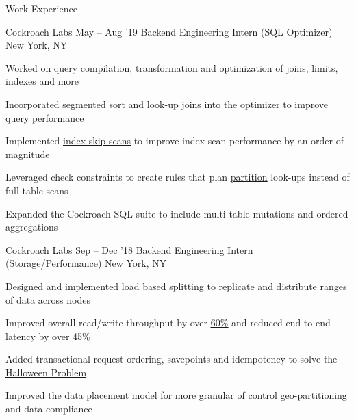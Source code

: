 \documentclass{resume} %
\begin{document}
\begin{rSection}{Work Experience}
  \begin{rSubsection}{Cockroach Labs}
    {May -- Aug '19}
         {Backend Engineering Intern (SQL Optimizer)}
         {New York, NY}
       \item Worked on query compilation, transformation and
         optimization of joins, limits, indexes and more
       \item Incorporated 
         \href{https://github.com/cockroachdb/cockroach/pull/38452}{\underline{segmented
             sort}}
         and 
         \href{https://github.com/cockroachdb/cockroach/pull/38285}{\underline{look-up}}
             joins into the optimizer
         to improve query performance
       \item Implemented
         \href{https://github.com/cockroachdb/cockroach/pull/39668}{\ul{index-skip-scans}}
         to improve index scan performance by an order of magnitude
       \item Leveraged check constraints to create rules that plan
         \href{https://github.com/cockroachdb/cockroach/pull/38963}{\underline{partition}}
         look-ups instead of full table scans
       \item Expanded the Cockroach SQL suite to include multi-table mutations
         and ordered aggregations
  \end{rSubsection}

  \begin{rSubsection}{Cockroach Labs}
    {Sep -- Dec '18}
         {Backend Engineering Intern (Storage/Performance)}
         {New York, NY}
       \item Designed and implemented \href{https://github.com/cockroachdb/cockroach/pull/31413}
      {\underline{load based splitting}} to replicate
      and distribute ranges of data across nodes
    \item Improved overall read/write throughput by over
         \setul{4pt}{.4pt}
         \href{https://github.com/cockroachdb/cockroach/issues/31819}{\ul{60\%}}
         and reduced end-to-end latency by over
         \href{https://github.com/cockroachdb/cockroach/issues/31819}{\ul{45\%}}
       \item Added transactional request
           ordering, savepoints and idempotency to solve the 
         \setul{4pt}{.4pt}
         \href{https://github.com/cockroachdb/cockroach/pull/33244}{\ul{Halloween
             Problem}}
       \item Improved the data placement
         model for more granular of control geo-partitioning and data compliance
  \end{rSubsection}


\end{rSection}
\end{document}
